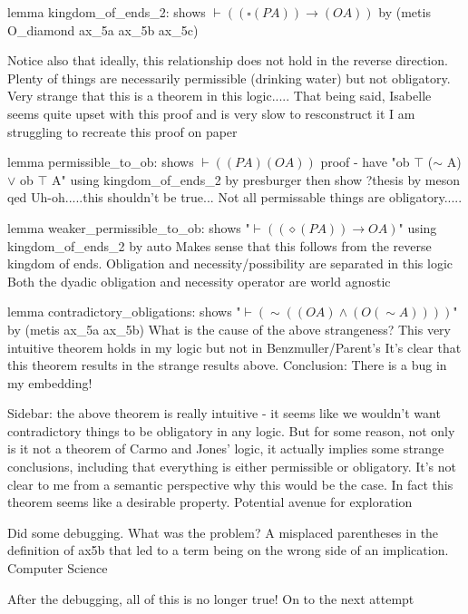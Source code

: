 \begin{isabellebody}
{lemma kingdom_of_ends_2:
  shows $\vdash ((\square (P A)) \longrightarrow (O A))$
  by (metis O_diamond ax_5a ax_5b ax_5c)

Notice also that ideally, this relationship does not hold in the reverse direction.
Plenty of things are necessarily permissible (drinking water) but not obligatory.
Very strange that this is a theorem in this logic.....
That being said, Isabelle seems quite upset with this proof and is very slow to resconstruct it
I am struggling to recreate this proof on paper


lemma permissible_to_ob:
  shows $\vdash ((P A) (O A))$
proof -
have "ob $\top$ ($\sim$ A) $\vee$ ob $\top$ A"
using kingdom_of_ends_2 by presburger
  then show ?thesis
by meson
qed
Uh-oh.....this shouldn't be true...
Not all permissable things are obligatory.....

lemma weaker_permissible_to_ob:
  shows "$\vdash ((\diamond (P A)) \longrightarrow O A)$"
  using kingdom_of_ends_2 by auto
Makes sense that this follows from the reverse kingdom of ends.
Obligation and necessity/possibility are separated in this logic
Both the dyadic obligation and necessity operator are world agnostic

lemma contradictory_obligations:
  shows "$\vdash(\sim ((O A) \wedge (O (\sim A))))$"
  by (metis ax_5a ax_5b)
What is the cause of the above strangeness?
This very intuitive theorem holds in my logic but not in Benzmuller/Parent's
It's clear that this theorem results in the strange results above.
Conclusion: There is a bug in my embedding!%
}%
\begin{isamarkuptext}%
Sidebar: the above theorem is really intuitive - it seems like we wouldn't want 
contradictory things to be obligatory in any logic. But for some reason, not only is it not
a theorem of Carmo and Jones' logic, it actually implies some strange conclusions, including 
that everything is either permissible or obligatory. It's not clear to me from a semantic 
perspective why this would be the case. In fact this theorem seems like a desirable 
property. Potential avenue for exploration%
\end{isamarkuptext}\isamarkuptrue%
%
\begin{isamarkuptext}%
Did some debugging. What was the problem? A misplaced parentheses in the definition 
of ax5b that led to a term being on the wrong side of an implication. Computer Science%
\end{isamarkuptext}\isamarkuptrue%
%
\begin{isamarkuptext}%
After the debugging, all of this is no longer true! On to the next attempt%
\end{isamarkuptext}\isamarkuptrue%
%
\isadelimtheory
%
\endisadelimtheory
%
\isatagtheory
{}\isamarkupfalse%
%
\endisatagtheory
{\isafoldtheory}%
%
\isadelimtheory
%
\endisadelimtheory
%
\end{isabellebody}%

